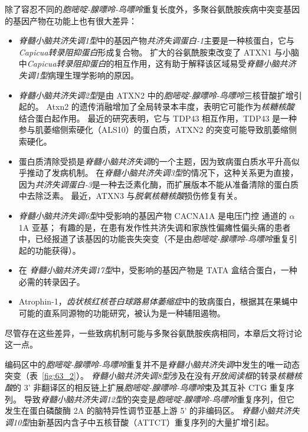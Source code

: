 除了容忍不同的\textit{胞嘧啶-腺嘌呤-鸟嘌呤}重复长度外，多聚谷氨酰胺疾病中突变基因的基因产物在功能上也有很大差异：


\begin{itemize}
	\item  \textit{脊髓小脑共济失调1型}中的基因产物\textit{共济失调蛋白-1}主要是一种核蛋白，它与\textit{Capicua转录阻抑蛋白}形成复合物。
	扩大的谷氨酰胺束改变了 ATXN1 与小脑中\textit{Capicua转录阻抑蛋白}的相互作用，这有助于解释该区域易受\textit{脊髓小脑共济失调1型}病理生理学影响的原因。
	
	
	\item \textit{脊髓小脑共济失调2型}是由 ATXN2 中的\textit{胞嘧啶-腺嘌呤-鸟嘌呤}三核苷酸扩增引起的。
	Atxn2 的遗传消融增加了全局转录本丰度，表明它可能作为\textit{核糖核酸}结合蛋白起作用。
	最近的研究表明，它与 TDP43 相互作用，TDP43 是一种参与肌萎缩侧索硬化（ALS10）的蛋白质，ATXN2 的突变可能导致肌萎缩侧索硬化。
	
	
	\item 蛋白质清除受损是\textit{脊髓小脑共济失调}的一个主题，因为致病蛋白质水平升高似乎推动了发病机制。
	在\textit{脊髓小脑共济失调3型}的情况下，这种关系更为直接，因为\textit{共济失调蛋白-3}是一种去泛素化酶，而扩展版本不能从准备清除的蛋白质中去除泛素。
	最近，ATXN3 与\textit{脱氧核糖核酸}损伤修复有关。
	
	
	\item \textit{脊髓小脑共济失调6型}中受影响的基因产物 CACNA1A 是电压门控  通道的 $\alpha$1A 亚基；
	有趣的是，在患有发作性共济失调和家族性偏瘫性偏头痛的患者中，已经报道了该基因的功能丧失突变（不是由\textit{胞嘧啶-腺嘌呤-鸟嘌呤}重复引起的功能获得）。
	
	
	\item 在 \textit{脊髓小脑共济失调17型}中，受影响的基因产物是 TATA 盒结合蛋白，一种必需的转录因子。
	
	
	\item Atrophin-1，\textit{齿状核红核苍白球路易体萎缩症}中的致病蛋白，根据其在果蝇中可能的直系同源物的功能研究，被认为是一种辅阻遏物。

\end{itemize}


尽管存在这些差异，一些致病机制可能与多聚谷氨酰胺疾病相同，本章后文将讨论这一点。


编码区中的\textit{胞嘧啶-腺嘌呤-鸟嘌呤}重复并不是\textit{脊髓小脑共济失调}中发生的唯一动态突变（表~\ref{fig:63_2}）。
\textit{脊髓小脑共济失调8型}涉及在没有\textit{开放阅读框}的转录\textit{核糖核酸}的 3' 非翻译区的相反链上扩展\textit{胞嘧啶-腺嘌呤-鸟嘌呤}束及其互补 CTG 重复序列。
导致\textit{脊髓小脑共济失调12型}的突变是\textit{胞嘧啶-腺嘌呤-鸟嘌呤}重复序列，但它发生在蛋白磷酸酶 2A 的脑特异性调节亚基上游 5' 的非编码区。
\textit{脊髓小脑共济失调10型}由新基因内含子中五核苷酸（ATTCT）重复序列的大量扩增引起。


